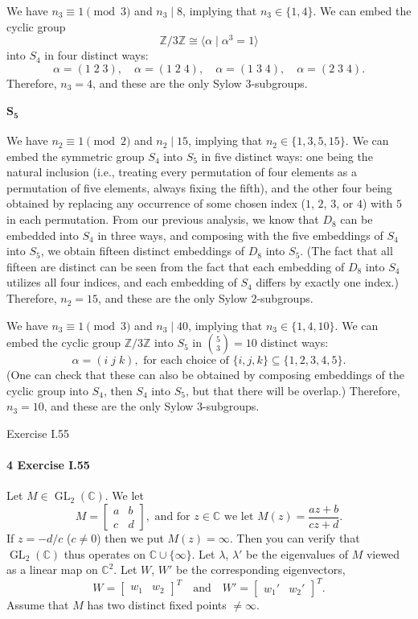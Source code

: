 \documentclass[12pt]{article}
\newlength{\myparskip}
\newenvironment{fullbox}{\begin{lrbox}{\savefullbox}\begin{minipage}{\dimexpr\textwidth-2\fboxsep\relax}\setlength{\parskip}{\myparskip}}{\end{minipage}\end{lrbox}\framebox[\textwidth]{\usebox{\savefullbox}}}
\newenvironment{pbox}[1][]{\begin{fullbox}\ifx#1\empty\else\paragraph{#1}\fi}{\end{fullbox}}
\newcommand{\isp}[1]{\quad\text{#1}\quad}
\newcommand{\Z}{\mathbb{Z}}
\newcommand{\C}{\mathbb{C}}
\newcommand{\<}{\langle}
\renewcommand{\>}{\rangle}
\newcommand{\isom}{\cong}
\DeclareMathOperator{\GL}{GL}
\newcommand{\mat}[1]{\begin{bmatrix}#1\end{bmatrix}}
\begin{document}
We have $n_3 \equiv 1 \pmod{3}$ and $n_3 \mid 8$, implying that $n_3 \in \{1, 4\}$. We can embed the cyclic group
\[
    \Z/3\Z \isom \<\alpha \mid \alpha^3 = 1\>
\]
into $S_4$ in four distinct ways:
\[
    \alpha = (1 \; 2 \; 3), \quad \alpha = (1 \; 2 \; 4), \quad \alpha = (1 \; 3 \; 4), \quad \alpha = (2 \; 3 \; 4).
\]
Therefore, $n_3 = 4$, and these are the only Sylow $3$-subgroups.


\paragraph{$\mathbf{S_5}$} We have $n_2 \equiv 1 \pmod{2}$ and $n_2 \mid 15$, implying that $n_2 \in \{1, 3, 5, 15\}$. We can embed the symmetric group $S_4$ into $S_5$ in five distinct ways: one being the natural inclusion (i.e., treating every permutation of four elements as a permutation of five elements, always fixing the fifth), and the other four being obtained by replacing any occurrence of some chosen index ($1$, $2$, $3$, or $4$) with $5$ in each permutation. From our previous analysis, we know that $D_8$ can be embedded into $S_4$ in three ways, and composing with the five embeddings of $S_4$ into $S_5$, we obtain fifteen distinct embeddings of $D_8$ into $S_5$. (The fact that all fifteen are distinct can be seen from the fact that each embedding of $D_8$ into $S_4$ utilizes all four indices, and each embedding of $S_4$ differs by exactly one index.) Therefore, $n_2 = 15$, and these are the only Sylow $2$-subgroups.

We have $n_3 \equiv 1 \pmod{3}$ and $n_3 \mid 40$, implying that $n_3 \in \{1, 4, 10\}$. We can embed the cyclic group $\Z/3\Z$ into $S_5$ in $\binom{5}{3} = 10$ distinct ways:
\[
    \alpha = (i \; j \; k), \text{ for each choice of } \{i, j, k\} \subseteq \{1, 2, 3, 4, 5\}.
\]
(One can check that these can also be obtained by composing embeddings of the cyclic group into $S_4$, then $S_4$ into $S_5$, but that there will be overlap.) Therefore, $n_3 = 10$, and these are the only Sylow $3$-subgroups.



\newpage
\begin{pbox}[4 Exercise I.55]
    Let $M \in \GL_2(\C)$. We let
    \[
        M = \mat{a & b \\ c & d}, \text{ and for } z \in \C \text{ we let } M(z) = \frac{az + b}{cz + d}.
    \]
    If $z = -d/c$ ($c \ne 0$) then we put $M(z) = \infty$. Then you can verify that $\GL_2(\C)$ thus operates on $\C \cup \{\infty\}$. Let $\lambda$, $\lambda'$ be the eigenvalues of $M$ viewed as a linear map on $\C^2$. Let $W$, $W'$ be the corresponding eigenvectors,
    \[
        W = \mat{w_1 & w_2}^T \isp{and} W' = \mat{w_1' & w_2'}^T.
    \]
    Assume that $M$ has two distinct fixed points $\ne \infty$.
\end{pbox}
\end{document}
